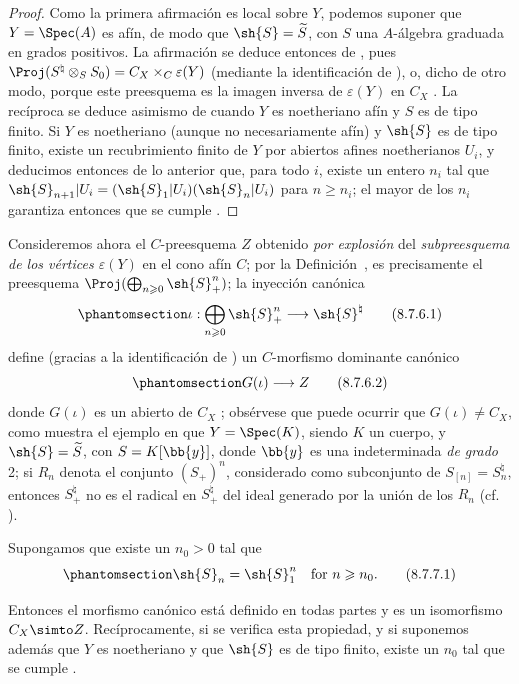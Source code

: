 \documentclass[oneside,10pt]{amsart}
\makeatletter
\renewcommand{\geq}{\geqslant}
\newcommand{\ega@arrow}[2]{\mathchoice{#1}{#2}{#2}{#2}}
\renewcommand{\to}{\ega@arrow{\longrightarrow}{\rightarrow}}
\newcommand{\oldpage}[2][]{\marginnote{\normalfont\footnotesize\textbf{#1}~|~#2}\ignorespaces}
\let\EGAOriginalLabel\label
\renewcommand{\label}[1]{\phantomsection\EGAOriginalLabel{#1}}
\makeatother
\begin{document}
\begin{proof}
Como la primera afirmación es local sobre $Y$, podemos suponer que $Y=\Spec(A)$ es afín, de modo que $\sh{S}=\widetilde{S}$, con $S$ una $A$-álgebra graduada en grados positivos.
La afirmación se deduce entonces de , pues $\Proj(S^\natural\otimes_S S_0) = C_X\times_C\varepsilon(Y)$ (mediante la identificación de ), o, dicho de otro modo, porque este preesquema es la imagen inversa de $\varepsilon(Y)$ en $C_X$ .
La recíproca se deduce asimismo de  cuando $Y$ es noetheriano afín y $S$ es de tipo finito.
\oldpage[II]{177}
Si $Y$ es noetheriano (aunque no necesariamente afín) y $\sh{S}$ es de tipo finito, existe un recubrimiento finito de $Y$ por abiertos afines noetherianos $U_i$, y deducimos entonces de lo anterior que, para todo $i$, existe un entero $n_i$ tal que $\sh{S}_{n+1}|U_i = (\sh{S}_1|U_i)(\sh{S}_n|U_i)$ para $n\geq n_i$;
el mayor de los $n_i$ garantiza entonces que se cumple .
\end{proof}
\begin{env}[8.7.6]
\label{II.8.7.6}
Consideremos ahora el $C$-preesquema $Z$ obtenido \emph{por explosión} del \emph{subpreesquema de los vértices $\varepsilon(Y)$} en el cono afín $C$;
por la Definición~, es precisamente el preesquema $\Proj(\bigoplus_{n\geq0}\sh{S}_+^n)$;
la inyección canónica
\[
\label{II.8.7.6.1}
  \iota: \bigoplus_{n\geq0} \sh{S}_+^n \to \sh{S}^\natural
\tag{8.7.6.1}
\]
define (gracias a la identificación de ) un $C$-morfismo dominante canónico
\[
\label{II.8.7.6.2}
  G(\iota)\to Z
  \tag{8.7.6.2}
\]
donde $G(\iota)$ es un abierto de $C_X$ ;
obsérvese que puede ocurrir que $G(\iota)\neq C_X$, como muestra el ejemplo en que $Y=\Spec(K)$, siendo $K$ un cuerpo, y $\sh{S}=\widetilde{S}$, con $S=K[\bb{y}]$, donde $\bb{y}$ es una indeterminada \emph{de grado} 2;
si $R_n$ denota el conjunto $(S_+)^n$, considerado como subconjunto de $S_{[n]}=S_n^\natural$, entonces $S_+^\natural$ no es el radical en $S_+^\natural$ del ideal generado por la unión de los $R_n$ (cf. ).
\end{env}
\begin{corollary}[8.7.7]
\label{II.8.7.7}
Supongamos que existe un $n_0>0$ tal que
\[
\label{II.8.7.7.1}
  \sh{S}_n=\sh{S}_1^n
  \quad
  \text{for }n\geq n_0.
  \tag{8.7.7.1}
\]

Entonces el morfismo canónico  está definido en todas partes y es un isomorfismo $C_X\simto Z$.
Recíprocamente, si se verifica esta propiedad, y si suponemos además que $Y$ es noetheriano y que $\sh{S}$ es de tipo finito, existe un $n_0$ tal que se cumple .
\end{corollary}
\end{document}
